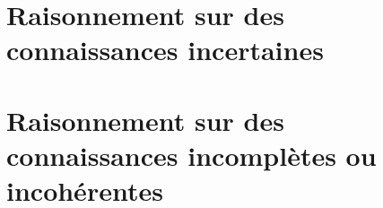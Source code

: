 


\chapter{Raisonnement sur des connaissances incertaines}


\chapter{Raisonnement sur des connaissances incomplètes ou incohérentes}

